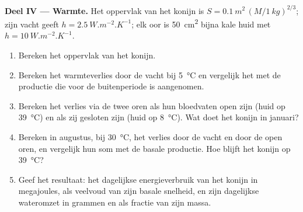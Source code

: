 \begin{problem}
\medskip
\noindent\textbf{Deel IV --- Warmte.}
Het oppervlak van het konijn is $S = \qty{0.1}{m^2}\,(M/\qty{1}{kg})^{2/3}$;
zijn vacht geeft $h = \qty{2.5}{W.m^{-2}.K^{-1}}$; elk oor is
\qty{50}{cm^2} bijna kale huid met $h = \qty{10}{W.m^{-2}.K^{-1}}$.
\begin{enumerate}[resume]
  \item Bereken het oppervlak van het konijn.
  \item Bereken het warmteverlies door de vacht bij \qty{5}{\celsius} en
        vergelijk het met de productie die voor de buitenperiode is
        aangenomen.
  \item Bereken het verlies via de twee oren als hun bloedvaten open zijn
        (huid op \qty{39}{\celsius}) en als zij gesloten zijn (huid op
        \qty{8}{\celsius}). Wat doet het konijn in januari?
  \item Bereken in augustus, bij \qty{30}{\celsius}, het verlies door de
        vacht en door de open oren, en vergelijk hun som met de basale
        productie. Hoe blijft het konijn op \qty{39}{\celsius}?
  \item Geef het resultaat: het dagelijkse energieverbruik van het konijn
        in megajoules, als veelvoud van zijn basale snelheid, en zijn
        dagelijkse wateromzet in grammen en als fractie van zijn massa.
\end{enumerate}
\end{problem}

